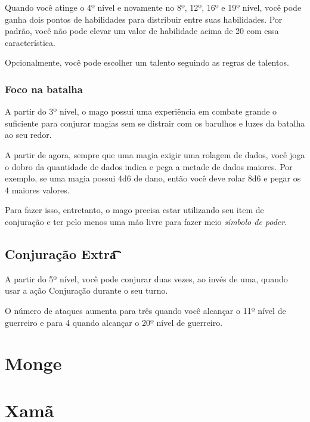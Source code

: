 \documentclass{RPG_Adventure}[2021/10/20]
\begin{document}
Quando você atinge o 4º nível e novamente no 8º, 12º, 16º e 19º nível, você pode
ganha dois pontos de habilidades para distribuir entre suas habilidades. Por
padrão, você não pode elevar um valor de habilidade acima de 20 com essa
característica.

Opcionalmente, você pode escolher um talento seguindo as regras de talentos.

\subsection*{Foco na batalha}%
\label{sub:foco_na_batalha}

A partir do 3º nível, o mago possui uma experiência em combate grande o
suficiente para conjurar magias sem se distrair com os barulhos e luzes da
batalha ao seu redor.

A partir de agora, sempre que uma magia exigir uma rolagem de dados, você joga o
dobro da quantidade de dados indica e pega a metade de dados maiores. Por
exemplo, se uma magia possui 4d6 de dano, então você deve rolar 8d6 e pegar os
4 maiores valores.

Para fazer isso, entretanto, o mago precisa estar utilizando seu item de
conjuração e ter pelo menos uma mão livre para fazer meio \textit{símbolo de
poder}.

\section*{Conjuração Extra\t\t\t\t\t\t\t}%
\label{sec:conjuraçao_extra}

A partir do 5º nível, você pode conjurar duas vezes, ao invés de uma, quando
usar a ação Conjuração durante o seu turno.

O número de ataques aumenta para três quando você alcançar o 11º nível de
guerreiro e para 4 quando alcançar o 20º nível de guerreiro.





\chapter{Monge}%
\label{cha:monge}


\chapter{Xamã}%
\label{cha:xama}
\end{document}
